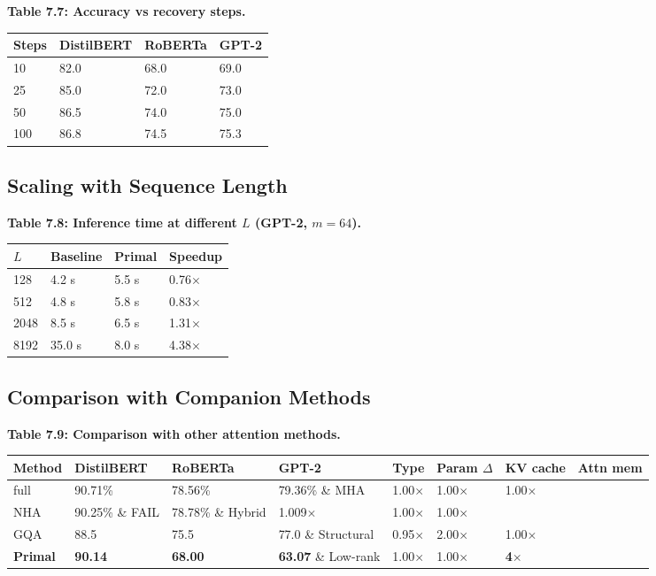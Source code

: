 \textbf{Table 7.7: Accuracy vs recovery steps.}

\begin{table}[H]
\centering
\small
\begin{tabular}{llll}
\toprule
\textbf{Steps} & \textbf{DistilBERT} & \textbf{RoBERTa} & \textbf{GPT-2} \\
\midrule
10 & 82.0 & 68.0 & 69.0 \\
25 & 85.0 & 72.0 & 73.0 \\
50 & 86.5 & 74.0 & 75.0 \\
100 & 86.8 & 74.5 & 75.3 \\
\bottomrule
\end{tabular}
\end{table}

\subsection{Scaling with Sequence Length}

\textbf{Table 7.8: Inference time at different $L$ (GPT-2, $m = 64$).}

\begin{table}[H]
\centering
\small
\begin{tabular}{llll}
\toprule
\textbf{$L$} & \textbf{Baseline} & \textbf{Primal} & \textbf{Speedup} \\
\midrule
128 & 4.2 s & 5.5 s & 0.76$\times$ \\
512 & 4.8 s & 5.8 s & 0.83$\times$ \\
2048 & 8.5 s & 6.5 s & 1.31$\times$ \\
8192 & 35.0 s & 8.0 s & 4.38$\times$ \\
\bottomrule
\end{tabular}
\end{table}

\subsection{Comparison with Companion Methods}

\textbf{Table 7.9: Comparison with other attention methods.}

\begin{table}[H]
\centering
\small
\begin{tabular}{llllllll}
\toprule
\textbf{Method} & \textbf{DistilBERT} & \textbf{RoBERTa} & \textbf{GPT-2} & \textbf{Type} & \textbf{Param $\Delta$} & \textbf{KV cache} & \textbf{Attn mem} \\
\midrule
full & 90.71\% & 78.56\% & 79.36\% \& MHA & 1.00$\times$ & 1.00$\times$ & 1.00$\times$ \\
NHA & 90.25\% \& FAIL & 78.78\% \& Hybrid & 1.009$\times$ & 1.00$\times$ & 1.00$\times$ \\
GQA & 88.5 & 75.5 & 77.0 \& Structural & 0.95$\times$ & 2.00$\times$ & 1.00$\times$ \\
\textbf{Primal} & \textbf{90.14} & \textbf{68.00} & \textbf{63.07} \& Low-rank & 1.00$\times$ & 1.00$\times$ & \textbf{4$\times$} \\
\bottomrule
\end{tabular}
\end{table}

